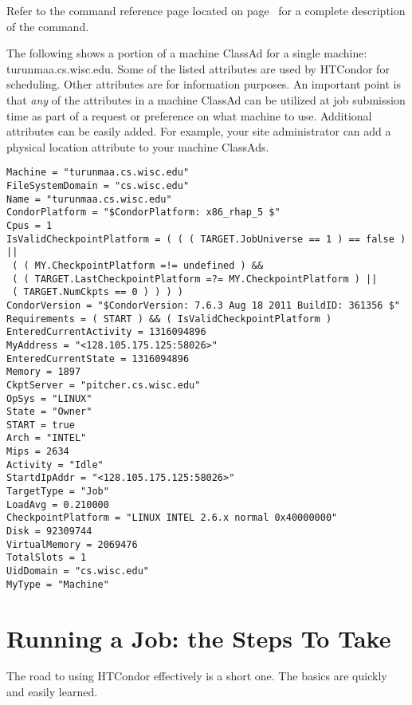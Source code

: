 Refer to the  command 
reference page located on page~\pageref{man-condor-status}
for a complete description of the  command.

The following shows a portion of a machine ClassAd
for a single machine: turunmaa.cs.wisc.edu. Some of the listed
attributes are used by
HTCondor for scheduling. Other attributes are for information purposes.
An important point is that \emph{any} of the attributes in a
machine ClassAd can be utilized at job submission time as part of a request
or preference on what machine to use. Additional attributes
can be easily added. For example, your site administrator can
add a physical location attribute to your machine ClassAds.


\footnotesize
\begin{verbatim}
Machine = "turunmaa.cs.wisc.edu"
FileSystemDomain = "cs.wisc.edu"
Name = "turunmaa.cs.wisc.edu"
CondorPlatform = "$CondorPlatform: x86_rhap_5 $"
Cpus = 1
IsValidCheckpointPlatform = ( ( ( TARGET.JobUniverse == 1 ) == false ) || 
 ( ( MY.CheckpointPlatform =!= undefined ) && 
 ( ( TARGET.LastCheckpointPlatform =?= MY.CheckpointPlatform ) || 
 ( TARGET.NumCkpts == 0 ) ) ) )
CondorVersion = "$CondorVersion: 7.6.3 Aug 18 2011 BuildID: 361356 $"
Requirements = ( START ) && ( IsValidCheckpointPlatform )
EnteredCurrentActivity = 1316094896
MyAddress = "<128.105.175.125:58026>"
EnteredCurrentState = 1316094896
Memory = 1897
CkptServer = "pitcher.cs.wisc.edu"
OpSys = "LINUX"
State = "Owner"
START = true
Arch = "INTEL"
Mips = 2634
Activity = "Idle"
StartdIpAddr = "<128.105.175.125:58026>"
TargetType = "Job"
LoadAvg = 0.210000
CheckpointPlatform = "LINUX INTEL 2.6.x normal 0x40000000"
Disk = 92309744
VirtualMemory = 2069476
TotalSlots = 1
UidDomain = "cs.wisc.edu"
MyType = "Machine"
\end{verbatim}
\normalsize


\section{Running a Job: the Steps To Take}

The road to using HTCondor effectively is a short one.  The basics
are quickly and easily learned.

